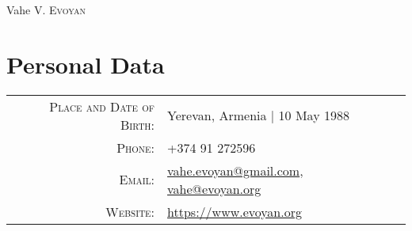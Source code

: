 \documentclass[a4paper,10pt]{article}
\begin{document}
\pagestyle{empty} %

\par{\centering
    {\Huge Vahe V. \textsc{Evoyan}
  }\bigskip\par}

\section{Personal Data}
\begin{tabular}{rl}
    \textsc{Place and Date of Birth:} & Yerevan, Armenia | 10 May 1988 \\
    \textsc{Phone:}                   & +374 91 272596\\
    \textsc{Email:}                   & \href{mailto:vahe.evoyan@gmail.com}
                                             {vahe.evoyan@gmail.com},
                                        \href{mailto:vahe@evoyan.org}
                                             {vahe@evoyan.org}\\
    \textsc{Website:}                 & \href{https://www.evoyan.org}
                                             {https://www.evoyan.org}
\end{tabular}


\end{document}
